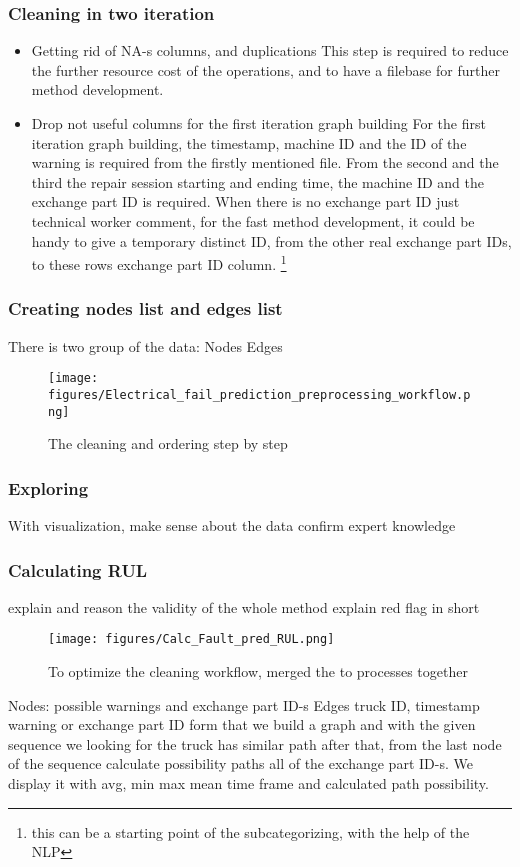 		\subsubsection{Cleaning in two iteration}
		\begin{itemize}
			\item{Getting rid of NA-s columns, and duplications} This step is required to reduce the further resource cost of the operations, and to have a filebase for further method development.
			\item{Drop not useful columns for the first iteration graph building} For the first iteration graph building, the timestamp, machine ID and the ID of the warning is required from the firstly mentioned file. From the second and the third the repair session starting and ending time, the machine ID and the exchange part ID is required. When there is no exchange part ID just technical worker comment, for the fast method development, it could be handy to give a temporary distinct ID, from the other real exchange part IDs, to these rows exchange part ID column. \footnote{this can be a starting point of the subcategorizing, with the help of the NLP} 
		\end{itemize}
		\subsubsection{Creating nodes list and edges list}
		There is two group of the data:
		Nodes
		Edges

		\begin{figure}[!ht]
		\centering
		\texttt{[image: figures/Electrical\_fail\_prediction\_preprocessing\_workflow.png]}
		\caption{The cleaning and ordering step by step} 
		\end{figure}


		\subsubsection{Exploring}
		With visualization, make sense about the data 
		confirm expert knowledge
		\subsubsection{Calculating RUL}
explain and reason the validity of the whole method
		explain red flag in short
		\begin{figure}[!ht]
		\centering
		\texttt{[image: figures/Calc\_Fault\_pred\_RUL.png]}
		\caption{To optimize the cleaning workflow, merged the to processes together} 
		\end{figure}
		Nodes: possible warnings and exchange part ID-s
		Edges truck ID, timestamp warning or exchange part ID
		form that we build a graph and with the given sequence we looking for the truck has similar path after that, from the last node of the sequence calculate possibility paths all of the exchange part ID-s. We display it with avg, min max mean time frame and calculated path possibility.